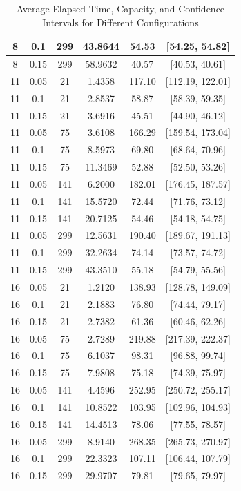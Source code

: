 \documentclass[10pt,a4paper]{article}
\begin{document}
\begin{table}[H]
\begin{tabular}{|c|c|c|c|c|c|}
    8 & 0.1 & 299 & 43.8644 & 54.53 & [54.25, 54.82] \\ \hline
    8 & 0.15 & 299 & 58.9632 & 40.57 & [40.53, 40.61] \\ \hline
    11 & 0.05 & 21 & 1.4358 & 117.10 & [112.19, 122.01] \\ \hline
    11 & 0.1 & 21 & 2.8537 & 58.87 & [58.39, 59.35] \\ \hline
    11 & 0.15 & 21 & 3.6916 & 45.51 & [44.90, 46.12] \\ \hline
    11 & 0.05 & 75 & 3.6108 & 166.29 & [159.54, 173.04] \\ \hline
    11 & 0.1 & 75 & 8.5973 & 69.80 & [68.64, 70.96] \\ \hline
    11 & 0.15 & 75 & 11.3469 & 52.88 & [52.50, 53.26] \\ \hline
    11 & 0.05 & 141 & 6.2000 & 182.01 & [176.45, 187.57] \\ \hline
    11 & 0.1 & 141 & 15.5720 & 72.44 & [71.76, 73.12] \\ \hline
    11 & 0.15 & 141 & 20.7125 & 54.46 & [54.18, 54.75] \\ \hline
    11 & 0.05 & 299 & 12.5631 & 190.40 & [189.67, 191.13] \\ \hline
    11 & 0.1 & 299 & 32.2634 & 74.14 & [73.57, 74.72] \\ \hline
    11 & 0.15 & 299 & 43.3510 & 55.18 & [54.79, 55.56] \\ \hline
    16 & 0.05 & 21 & 1.2120 & 138.93 & [128.78, 149.09] \\ \hline
    16 & 0.1 & 21 & 2.1883 & 76.80 & [74.44, 79.17] \\ \hline
    16 & 0.15 & 21 & 2.7382 & 61.36 & [60.46, 62.26] \\ \hline
    16 & 0.05 & 75 & 2.7289 & 219.88 & [217.39, 222.37] \\ \hline
    16 & 0.1 & 75 & 6.1037 & 98.31 & [96.88, 99.74] \\ \hline
    16 & 0.15 & 75 & 7.9808 & 75.18 & [74.39, 75.97] \\ \hline
    16 & 0.05 & 141 & 4.4596 & 252.95 & [250.72, 255.17] \\ \hline
    16 & 0.1 & 141 & 10.8522 & 103.95 & [102.96, 104.93] \\ \hline
    16 & 0.15 & 141 & 14.4513 & 78.06 & [77.55, 78.57] \\ \hline
    16 & 0.05 & 299 & 8.9140 & 268.35 & [265.73, 270.97] \\ \hline
    16 & 0.1 & 299 & 22.3323 & 107.11 & [106.44, 107.79] \\ \hline
    16 & 0.15 & 299 & 29.9707 & 79.81 & [79.65, 79.97] \\ \hline
\end{tabular}
    \caption{Average Elapsed Time, Capacity, and Confidence Intervals for Different Configurations}
    \label{tab:results}
\end{table}
\end{document}
